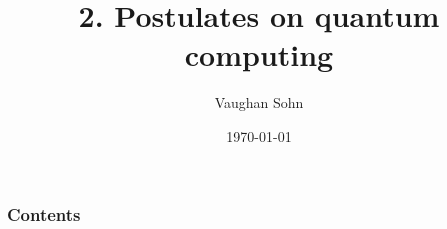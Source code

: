 \documentclass[9pt]{beamer}
\title{2. Postulates on quantum computing}
\date{\today}
\author{Vaughan Sohn}
\begin{document}
    \maketitle
    
    \begin{frame}
        \frametitle{Contents}
        \tableofcontents
    \end{frame}
\end{document}

